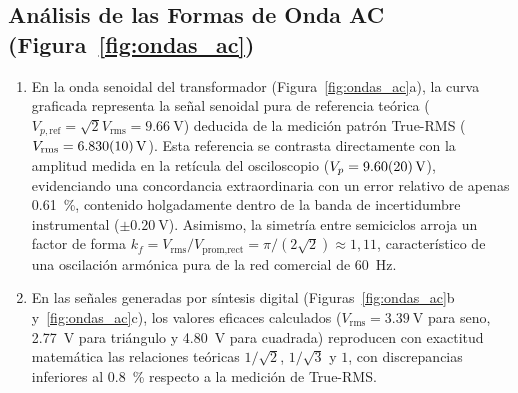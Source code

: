 \subsection{Análisis de las Formas de Onda AC (Figura~\ref{fig:ondas_ac})}
\begin{enumerate}
    \item En la onda senoidal del transformador (Figura~\ref{fig:ondas_ac}a), la curva graficada representa la señal senoidal pura de referencia teórica ($V_{p,\text{ref}} = \sqrt{2} V_{\text{rms}} = \qty{9,66}{\volt}$) deducida de la medición patrón True-RMS ($V_{\text{rms}} = \qty{6,830 \pm 0,010}{\volt}$). Esta referencia se contrasta directamente con la amplitud medida en la retícula del osciloscopio ($V_p = \qty{9,60 \pm 0,20}{\volt}$), evidenciando una concordancia extraordinaria con un error relativo de apenas \qty{0,61}{\percent}, contenido holgadamente dentro de la banda de incertidumbre instrumental ($\pm\qty{0,20}{\volt}$). Asimismo, la simetría entre semiciclos arroja un factor de forma $k_f = V_{\text{rms}} / V_{\text{prom,rect}} = \pi / (2\sqrt{2}) \approx 1{,}11$, característico de una oscilación armónica pura de la red comercial de \qty{60}{\hertz}.
    \item En las señales generadas por síntesis digital (Figuras~\ref{fig:ondas_ac}b y~\ref{fig:ondas_ac}c), los valores eficaces calculados ($V_{\text{rms}} = \qty{3,39}{\volt}$ para seno, \qty{2,77}{\volt} para triángulo y \qty{4,80}{\volt} para cuadrada) reproducen con exactitud matemática las relaciones teóricas $1/\sqrt{2}$, $1/\sqrt{3}$ y $1$, con discrepancias inferiores al \qty{0,8}{\percent} respecto a la medición de True-RMS.
\end{enumerate}

